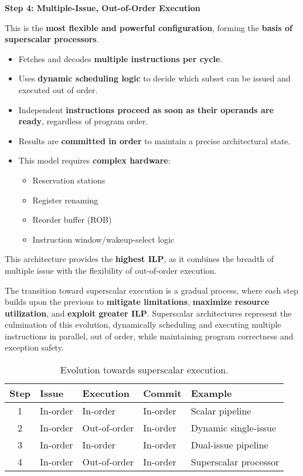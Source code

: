 \highspace
\begin{flushleft}
    \textcolor{Green3}{\faIcon{\speedIcon} \textbf{Step 4: Multiple-Issue, Out-of-Order Execution}}
\end{flushleft}
This is the \textbf{most flexible and powerful configuration}, forming the \textbf{basis of superscalar processors}.
\begin{itemize}
    \item Fetches and decodes \textbf{multiple instructions per cycle}.
    \item Uses \textbf{dynamic scheduling logic} to decide which subset can be issued and executed out of order.
    \item Independent \textbf{instructions proceed as soon as their operands are ready}, regardless of program order.
    \item Results are \textbf{committed in order} to maintain a precise architectural state.
    \item This model requires \textbf{complex hardware}:
    \begin{itemize}
        \item Reservation stations
        \item Register renaming
        \item Reorder buffer (ROB)
        \item Instruction window/wakeup-select logic
    \end{itemize}
\end{itemize}
This architecture provides the \textcolor{Green3}{\textbf{highest ILP}}, as it combines the breadth of multiple issue with the flexibility of out-of-order execution.

\newpage

\noindent
The transition toward superscalar execution is a gradual process, where each step builds upon the previous to \textbf{mitigate limitations}, \textbf{maximize resource utilization}, and \textbf{exploit greater ILP}. Superscalar architectures represent the culmination of this evolution, dynamically scheduling and executing multiple instructions in parallel, out of order, while maintaining program correctness and exception safety.

\begin{table}[!htp]
    \centering
    \begin{tabular}{@{} c | l | l | l | l @{}}
        \toprule
        \textbf{Step} & \textbf{Issue} & \textbf{Execution} & \textbf{Commit} & \textbf{Example} \\
        \midrule
        1             & In-order       & In-order           & In-order        & Scalar pipeline \\ [.3em]
        2             & In-order       & Out-of-order       & In-order        & Dynamic single-issue \\ [.3em]
        3             & In-order       & In-order           & In-order        & Dual-issue pipeline \\ [.3em]
        4             & In-order       & Out-of-order       & In-order        & Superscalar processor \\
        \bottomrule
    \end{tabular}
    \caption{Evolution towards superscalar execution.}
\end{table}